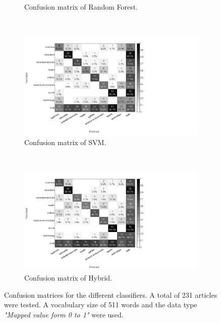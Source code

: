 \begin{figure}[H]
\begin{subfigure}[b]{\figwidth}
		\caption{Confusion matrix of Random Forest.}
		\label{fig:confmat-rf}
	\end{subfigure}
	~
	\begin{subfigure}[b]{\figwidth}
		\includegraphics[width=\textwidth,trim=0 0 350 0, clip]{img/SVM_percentile_5_count.png}
		\caption{Confusion matrix of SVM.}
		\label{fig:confmat-svm}
	\end{subfigure}
	\\
	\begin{subfigure}[b]{\figwidth}
		\includegraphics[width=\textwidth,trim=0 0 350 0, clip]{img/hybrid_percentile_5_count.png}
		\caption{Confusion matrix of Hybrid.}
		\label{fig:confmat-hybrid}
	\end{subfigure}
	\caption{Confusion matrices for the different classifiers. A total of 231 articles were tested. A vocabulary size of 511 words and the data type \emph{"Mapped value form 0 to 1"} were used.}
	\label{fig:confmat}
\end{figure}
